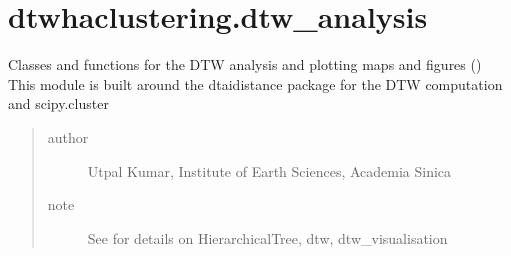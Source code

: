 \documentclass[letterpaper,10pt,english]{sphinxmanual}
\begin{document}
\chapter{dtwhaclustering.dtw\_analysis}
\label{\detokenize{modules/dtw_analysis:module-dtwhaclustering.dtw_analysis}}\label{\detokenize{modules/dtw_analysis:dtwhaclustering-dtw-analysis}}\label{\detokenize{modules/dtw_analysis::doc}}
\sphinxAtStartPar
Classes and functions for the DTW analysis and plotting maps and figures ()
This module is built around the dtaidistance package for the DTW computation and scipy.cluster
\begin{quote}\begin{description}
\item[{author}] \leavevmode
\sphinxAtStartPar
Utpal Kumar, Institute of Earth Sciences, Academia Sinica

\item[{note}] \leavevmode
\sphinxAtStartPar
See  for details on HierarchicalTree, dtw, dtw\_visualisation

\end{description}\end{quote}
\end{document}
